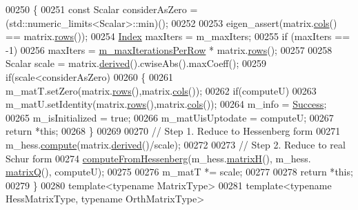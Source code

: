 \begin{DoxyCode}
00250 \{
00251   \textcolor{keyword}{const} Scalar considerAsZero = (std::numeric\_limits<Scalar>::min)();
00252 
00253   eigen\_assert(matrix.\hyperlink{group___core___module_a7b0b45c7351847696c911ce8aa2abbdb}{cols}() == matrix.\hyperlink{group___core___module_a8141320ba8df384426c298b32b000d8e}{rows}());
00254   \hyperlink{group___eigenvalues___module_a8bd4653e2d9569a44ecc95e746422d3f}{Index} maxIters = m\_maxIters;
00255   \textcolor{keywordflow}{if} (maxIters == -1)
00256     maxIters = \hyperlink{group___eigenvalues___module_ab42163ff22cd3ad98aa2bde39b4bbc79}{m\_maxIterationsPerRow} * matrix.\hyperlink{group___core___module_a8141320ba8df384426c298b32b000d8e}{rows}();
00257 
00258   Scalar scale = matrix.\hyperlink{group___core___module_a324b16961a11d2ecfd2d1b7dd7946545}{derived}().cwiseAbs().maxCoeff();
00259   \textcolor{keywordflow}{if}(scale<considerAsZero)
00260   \{
00261     m\_matT.setZero(matrix.\hyperlink{group___core___module_a8141320ba8df384426c298b32b000d8e}{rows}(),matrix.\hyperlink{group___core___module_a7b0b45c7351847696c911ce8aa2abbdb}{cols}());
00262     \textcolor{keywordflow}{if}(computeU)
00263       m\_matU.setIdentity(matrix.\hyperlink{group___core___module_a8141320ba8df384426c298b32b000d8e}{rows}(),matrix.\hyperlink{group___core___module_a7b0b45c7351847696c911ce8aa2abbdb}{cols}());
00264     m\_info = \hyperlink{group__enums_gga85fad7b87587764e5cf6b513a9e0ee5ea52581b035f4b59c203b8ff999ef5fcea}{Success};
00265     m\_isInitialized = \textcolor{keyword}{true};
00266     m\_matUisUptodate = computeU;
00267     \textcolor{keywordflow}{return} *\textcolor{keyword}{this};
00268   \}
00269 
00270   \textcolor{comment}{// Step 1. Reduce to Hessenberg form}
00271   m\_hess.\hyperlink{group___eigenvalues___module_a239a6fd42c57aab3c0b048c47fde3004}{compute}(matrix.\hyperlink{group___core___module_a324b16961a11d2ecfd2d1b7dd7946545}{derived}()/scale);
00272 
00273   \textcolor{comment}{// Step 2. Reduce to real Schur form  }
00274   \hyperlink{group___eigenvalues___module_ac4acc917dcaddefae5f35acd2c536d65}{computeFromHessenberg}(m\_hess.\hyperlink{group___eigenvalues___module_a8e781d2e22a2304647bcf0ae913cc8ea}{matrixH}(), m\_hess.
      \hyperlink{group___eigenvalues___module_a346441e4902a58d43d698ac3da6ff791}{matrixQ}(), computeU);
00275 
00276   m\_matT *= scale;
00277   
00278   \textcolor{keywordflow}{return} *\textcolor{keyword}{this};
00279 \}
00280 \textcolor{keyword}{template}<\textcolor{keyword}{typename} MatrixType>
00281 \textcolor{keyword}{template}<\textcolor{keyword}{typename} HessMatrixType, \textcolor{keyword}{typename} OrthMatrixType>

\end{DoxyCode}

